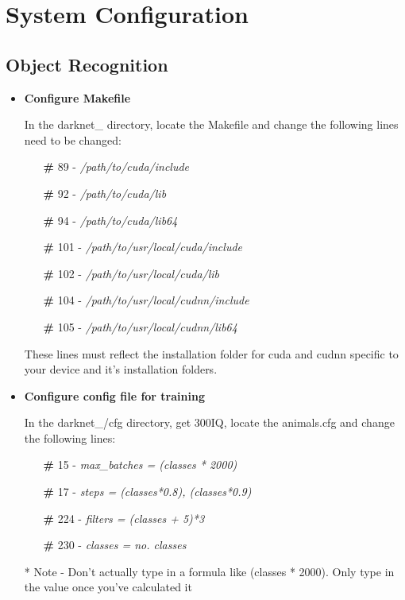 \chapter{System Configuration}
\section{Object Recognition}

\begin{itemize}
\item \textbf{Configure Makefile}

In the darknet\_ directory, locate the Makefile and change the following lines need to be changed:

\begin{itemize}
    \item[\textbf{\#}] 89  - \textit{/path/to/cuda/include}
    \item[\textbf{\#}] 92 - \textit{/path/to/cuda/lib}
    \item[\textbf{\#}] 94 - \textit{/path/to/cuda/lib64}
    \item[\textbf{\#}] 101 - \textit{/path/to/usr/local/cuda/include}
    \item[\textbf{\#}] 102 - \textit{/path/to/usr/local/cuda/lib}
    \item[\textbf{\#}] 104 - \textit{/path/to/usr/local/cudnn/include}
    \item[\textbf{\#}] 105 - \textit{/path/to/usr/local/cudnn/lib64}
\end{itemize}

These lines must reflect the installation folder for cuda and cudnn specific to your device and it's installation folders.

\item \textbf{Configure config file for training}

In the darknet\_/cfg directory, get 300IQ, locate the animals.cfg and change the following lines:

\begin{itemize}
    \item[\textbf{\#}] 15  - \textit{max\_batches = (classes * 2000)}
    \item[\textbf{\#}] 17 - \textit{steps = (classes*0.8), (classes*0.9)}
    \item[\textbf{\#}] 224 - \textit{filters = (classes + 5)*3}
    \item[\textbf{\#}] 230 - \textit{classes = no. classes}
\end{itemize}

* Note - Don't actually type in a formula like (classes * 2000). Only type in the value once you've calculated it

\end{itemize}